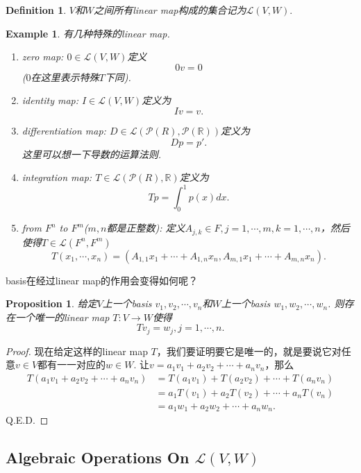 \documentclass{article}
\newtheorem{proposition}[theorem]{Proposition}
\newtheorem{example}[theorem]{Example}
\newtheorem{definition}[theorem]{Definition}
\newcommand*{\xfunc}[4]{{#2}\colon{#3}{#1}{#4}}
\newcommand*{\func}[3]{\xfunc{\to}{#1}{#2}{#3}}
\begin{document}
\begin{definition}
\rm $V$和$W$之间所有linear map构成的集合记为$\mathcal{L}(V,W).$
\end{definition}

\begin{example}
\rm 有几种特殊的linear map.
\begin{enumerate}
	\item zero map: $0 \in \mathcal{L}(V,W)$定义\[0v=0\]($0$在这里表示特殊$T$下同).
	\item identity map: $I \in \mathcal{L}(V,W)$定义为\[Iv=v.\]
	\item differentiation map: $D \in \mathcal{L}(\mathcal{P}({R}),\mathcal{P}(\mathbb{R}))$定义为\[Dp = p'.\] 这里可以想一下导数的运算法则.
	\item integration map: $T \in \mathcal{L}(\mathcal{P}({R}),\mathbb{R})$定义为\[Tp = \int_{0}^{1} p(x)dx.\]
	\item from $F^n$ to $F^m$($m,n$都是正整数): 定义$A_{j,k} \in F, j = 1,\cdots,m , k = 1,\cdots,n$，然后使得$T \in \mathcal{L}(F^n,F^m)$
	$$
		T(x_1,\cdots,x_n) = (A_{1,1}x_1+\cdots+A_{1,n}x_n,A_{m,1}x_1+\cdots+A_{m,n}x_n).
	$$
\end{enumerate}
\end{example}


{\color{red} basis在经过linear map的作用会变得如何呢}？

\begin{proposition}
\rm 给定$V$上一个basis $v_1,v_2,\cdots,v_n$和$W$上一个basis $w_1,w_2,\cdots,w_n$. 则存在一个唯一的linear map $\func{T}{V}{W}$使得
$$
	Tv_j = w_j, j = 1,\cdots,n.
$$
\end{proposition}

\begin{proof}
现在给定这样的linear map $T$，我们要证明要它是唯一的，就是要说它对任意$v \in V$都有一一对应的$w \in W$. 让$v = a_1v_1+a_2v_2+\cdots+a_nv_n$，那么
$$
\begin{aligned}
T(a_1v_1+a_2v_2+\cdots+a_nv_n) &= T(a_1v_1) + T(a_2v_2) + \cdots + T(a_nv_n)\\
 &= a_1T(v_1) + a_2T(v_2) + \cdots + a_nT(v_n)\\
 &= a_1w_1 + a_2w_2 + \cdots + a_nw_n.
\end{aligned}
$$
Q.E.D.
\end{proof}

\newpage
\subsection{Algebraic Operations On $\mathcal{L}(V,W)$}
\end{document}
